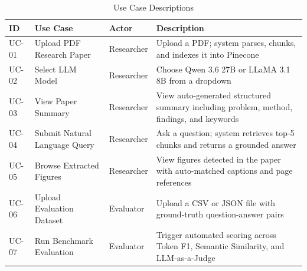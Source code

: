 \begin{table}[H]

\centering

\caption{Use Case Descriptions}

\label{tab:usecases}

\begin{tabular}{|p{1.2cm}|p{4cm}|p{2.5cm}|p{5cm}|}

\hline

\textbf{ID} & \textbf{Use Case} & \textbf{Actor} & \textbf{Description} \\

\hline

UC-01 & Upload PDF Research Paper & Researcher & Upload a PDF; system parses, chunks, and indexes it into Pinecone \\

\hline

UC-02 & Select LLM Model & Researcher & Choose Qwen 3.6 27B or LLaMA 3.1 8B from a dropdown \\

\hline

UC-03 & View Paper Summary & Researcher & View auto-generated structured summary including problem, method, findings, and keywords \\

\hline

UC-04 & Submit Natural Language Query & Researcher & Ask a question; system retrieves top-5 chunks and returns a grounded answer \\

\hline

UC-05 & Browse Extracted Figures & Researcher & View figures detected in the paper with auto-matched captions and page references \\

\hline

UC-06 & Upload Evaluation Dataset & Evaluator & Upload a CSV or JSON file with ground-truth question-answer pairs \\

\hline

UC-07 & Run Benchmark Evaluation & Evaluator & Trigger automated scoring across Token F1, Semantic Similarity, and LLM-as-a-Judge \\

\hline

\end{tabular}

\end{table}

